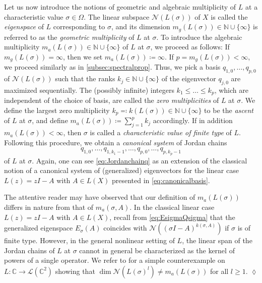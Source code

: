 \documentclass[english]{myarticle}
\begin{document}
\begin{sloppypar}
Let us now introduce the notions of geometric and algebraic multiplicity of $L$ at a characteristic value $\sigma \in \Omega$. The linear subspace $\mathcal{N}(L(\sigma))$ of $X$ is called the \emph{eigenspace} of $L$ corresponding to $\sigma$, and its dimension $m_g(L(\sigma)) \in \mathbb{N} \cup \{ \infty \}$ is referred to as the \emph{geometric multiplicity} of $L$ at $\sigma$. To introduce the algebraic multiplicity $m_a(L(\sigma)) \in \mathbb{N} \cup \{ \infty \}$ of $L$ at $\sigma$, we proceed as follows: If $m_g(L(\sigma)) = \infty$, then we set $m_a(L(\sigma)) \coloneqq \infty$. If $p = m_g(L(\sigma)) < \infty$, we proceed similarly as in \cref{subsec:spectralprop}. Thus, we pick a basis $q_{1,0},\dots,q_{p,0}$ of $\mathcal{N}(L(\sigma))$ such that the ranks $k_j \in \mathbb{N} \cup \{\infty\}$ of the eigenvector $q_{j,0}$ are maximized sequentially. The (possibly infinite) integers $k_1 \leq \dots \leq k_p$, which are independent of the choice of basis, are called the \emph{zero multiplicities} of $L$ at $\sigma$. We define the largest zero multiplicity $k_p \eqqcolon k(L(\sigma)) \in \mathbb{N} \cup \{\infty\}$ to be the \emph{ascent} of $L$ at $\sigma$, and define $m_a(L(\sigma)) \coloneqq \sum_{j=1}^p k_j$ accordingly. If in addition $m_a(L(\sigma)) < \infty$, then $\sigma$ is called a \emph{characteristic value of finite type} of $L$. Following this procedure, we obtain a \emph{canonical system} of Jordan chains 
\begin{equation} \label{eq:Jordanchainq}
    q_{1,0},\dots,q_{1,k_1 - 1},\dots,q_{p,0},\dots,q_{p,k_p - 1}
\end{equation}
of $L$ at $\sigma$. Again, one can see \eqref{eq:Jordanchainq} as an extension of the classical notion of a canonical system of (generalized) eigenvectors for the linear case $L(z) = zI-A$ with $A \in L(X)$ presented in \eqref{eq:canonicalbasis}.

\begin{remark}
The attentive reader may have observed that our definition of $m_a(L(\sigma))$ differs in nature from that of $m_a(\sigma,A)$. In the classical linear case $L(z) = zI-A$ with $A \in L(X)$, recall from \eqref{eq:EsigmaQsigma} that the generalized eigenspace $E_\sigma(A)$ coincides with $\mathcal{N}((\sigma I - A)^{k(\sigma,A)})$ if $\sigma$ is of finite type. However, in the general nonlinear setting of $L$, the linear span of the Jordan chains of $L$ at $\sigma$ cannot in general be characterized as the kernel of powers of a single operator. We refer to \cite[Section 5.1.1]{Kaashoek2022} for a simple counterexample on $L \colon \mathbb{C} \to \mathcal{L}(\mathbb{C}^2)$ showing that $\dim \mathcal{N}(L(\sigma)^l) \neq m_a(L(\sigma))$ for all $l \geq 1$. \hfill $\lozenge$
\end{remark}


\end{sloppypar}
\end{document}
